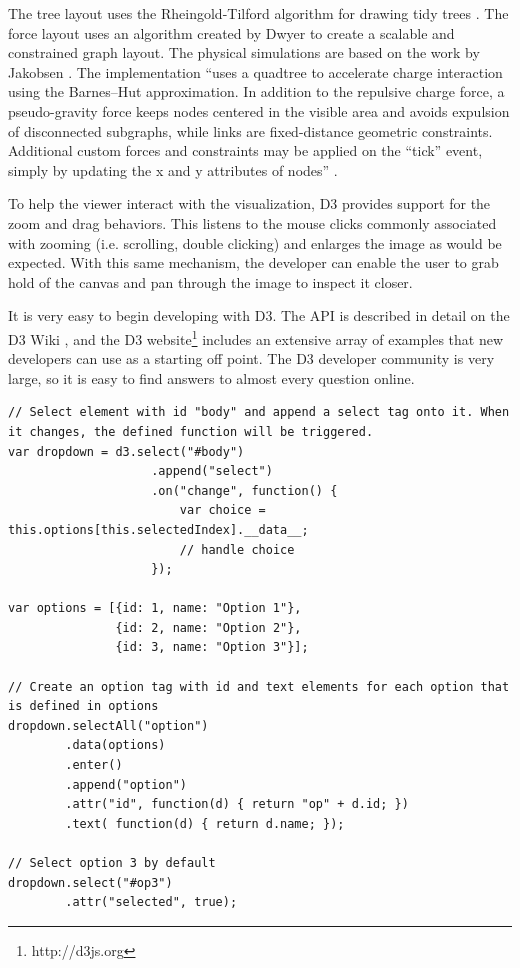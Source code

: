 The tree layout uses the Rheingold-Tilford algorithm for drawing tidy trees \cite{Reingold81}. The force layout uses an algorithm created by Dwyer \cite{Dwyer2009} to create a scalable and constrained graph layout. The physical simulations are based on the work by Jakobsen \cite{Jakobsen03}. The implementation ``uses a quadtree to accelerate charge interaction using the Barnes–Hut approximation. In addition to the repulsive charge force, a pseudo-gravity force keeps nodes centered in the visible area and avoids expulsion of disconnected subgraphs, while links are fixed-distance geometric constraints. Additional custom forces and constraints may be applied on the ``tick'' event, simply by updating the x and y attributes of nodes'' \cite{D3Wiki}.

To help the viewer interact with the visualization, D3 provides support for the zoom and drag behaviors. This listens to the mouse clicks commonly associated with zooming (i.e. scrolling, double clicking) and enlarges the image as would be expected. With this same mechanism, the developer can enable the user to grab hold of the canvas and pan through the image to inspect it closer.

It is very easy to begin developing with D3. The API is described in detail on the D3 Wiki \cite{D3Wiki}, and the D3 website\footnote{http://d3js.org} includes an extensive array of examples that new developers can use as a starting off point. The D3 developer community is very large, so it is easy to find answers to almost every question online. 

\lstset{language=Java}
\begin{lstlisting}[caption=Dynamically create a dropdown menu.,label=d3Example]
// Select element with id "body" and append a select tag onto it. When it changes, the defined function will be triggered.
var dropdown = d3.select("#body")
				   	.append("select")
				   	.on("change", function() {
				   		var choice = this.options[this.selectedIndex].__data__;
				   		// handle choice
				   	});

var options = [{id: 1, name: "Option 1"},
			   {id: 2, name: "Option 2"},
			   {id: 3, name: "Option 3"}];

// Create an option tag with id and text elements for each option that is defined in options
dropdown.selectAll("option")
		.data(options)
		.enter()
		.append("option")
		.attr("id", function(d) { return "op" + d.id; })
		.text( function(d) { return d.name; });

// Select option 3 by default
dropdown.select("#op3")
		.attr("selected", true);
\end{lstlisting} 

